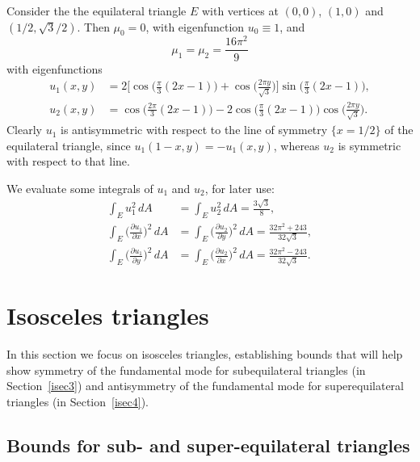 \documentclass[11pt,reqno]{amsart}
\numberwithin{equation}{section}
\begin{document}
Consider the the equilateral triangle $E$ with vertices at $(0,0)$,
$(1,0)$ and $(1/2,\sqrt{3}/2)$. Then $\mu_0=0$, with eigenfunction
$u_0 \equiv 1$, and
\[
\mu_1 = \mu_2 = \frac{16 \pi^2}{9}
\]
with eigenfunctions
  \begin{align*}
    u_1(x,y) & = 2 \Big[ \cos \big( \frac{\pi}{3}(2x-1) \big) + \cos \big( \frac{2\pi y}{\sqrt{3}} \big) \Big] \sin \big( \frac{\pi}{3} (2x-1)
    \big) , \\
    u_2(x,y) & = \cos \big( \frac{2\pi}3(2x-1) \big) - 2\cos\big( \frac\pi3(2x-1) \big) \cos\big( \frac{2\pi y}{\sqrt{3}} \big) .
  \end{align*}
Clearly $u_1$ is antisymmetric with respect to the line of symmetry
$\{ x=1/2 \}$ of the equilateral triangle, since
$u_1(1-x,y)=-u_1(x,y)$, whereas $u_2$ is symmetric with respect to
that line.

We evaluate some integrals of $u_1$ and $u_2$, for later use:
\begin{align*}
\int_E u_1^2 \, dA & = \int_E u_2^2 \, dA = \frac{3\sqrt{3}}{8} , \\
\int_E \Big( \frac{\partial u_1}{\partial x} \Big)^{\! 2} \, dA & = \int_E \Big( \frac{\partial u_2}{\partial y} \Big)^{\! 2} \, dA = \frac{32\pi^2 + 243}{32\sqrt{3}} , \\
\int_E \Big( \frac{\partial u_1}{\partial y} \Big)^{\! 2} \, dA &
= \int_E \Big( \frac{\partial u_2}{\partial x} \Big)^{\! 2} \, dA
= \frac{32\pi^2 - 243}{32\sqrt{3}} .
\end{align*}

\section{\bf Isosceles triangles}

In this section we focus on isosceles triangles, establishing bounds that will help show symmetry
of the fundamental mode for subequilateral triangles (in
Section~\ref{isec3}) and antisymmetry of the fundamental mode for
superequilateral triangles (in Section~\ref{isec4}).

\subsection{Bounds for sub- and super-equilateral triangles} \label{isec1}
\end{document}
